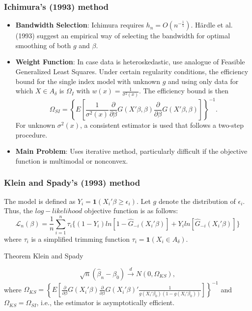 \documentclass{beamer}
\begin{document}
\begin{frame}
\frametitle{Ichimura's (1993) method}
\begin{itemize}
		\item \textbf{Bandwidth Selection}:
Ichimura requires $h_n=O(n^{-\frac{1}{5}})$. H{\"a}rdle et al. (1993) suggest an empirical way of selecting the bandwidth for optimal smoothing of both $g$ and $\beta$.
		\item \textbf{Weight Function}:
	In case data is heteroskedastic, use analogue of Feasible Generalized Least Squares. Under certain regularity conditions, the efficiency bound for the single index model with unknown $g$ and using only data for which $X \in A_{\delta}$ is $\Omega_I$ with $w(x) = \frac{1}{\sigma^2(x)}$. The efficiency bound is then
		\begin{equation}
\Omega_{SI} = \left\{ E\left[\frac{1}{\sigma^2(x)}\frac{\partial}{\partial \beta}
 G(X'\beta,\beta)\frac{\partial}{\partial \beta} G(X'\beta,\beta) \right] \right\}^{-1}.
		\end{equation}
For unknown $\sigma^2(x)$, a consistent estimator is used that follows a two-step procedure.
		\item \textbf{Main Problem}: Uses iterative method, particularly difficult if the objective function is multimodal or nonconvex.
\end{itemize}
\end{frame}






\begin{frame}
\frametitle{Klein and Spady's (1993) method}

The model is defined as $Y_i =  \mathbf{1}{(X_i'\beta \geq \epsilon_i)}$. Let $g$ denote the distribution of $\epsilon_i$.
Thus, the $log-likelihood$ objective function is as follows:
\begin{equation}
\mathcal{L}_n(\beta) = \frac{1}{n}\sum_{i=1}^n \tau_{i}\{ (1 - Y_i)ln[ 1 - \hat{G}_{-i}(X_i'\beta)] +  Y_iln[\hat{G}_{-i}(X_i'\beta)]\}
\end{equation}
where $\tau_i$ is a simplified trimming function $\tau_i = \mathbf{1}{(X_i \in A_\delta)}$.
\begin{block}{Theorem Klein and Spady}
{\footnotesize \[\sqrt{n}(\hat{\beta}_{n} - \beta_0) \stackrel{d}{\rightarrow} N(0,\Omega_{KS}),
\] where $ \Omega_{KS} = \left\{ E\left[\frac{\partial}{\partial \beta}
 G(X_i'\beta)\frac{\partial}{\partial \beta} G(X_i'\beta)'\frac{1}{g(X_i'\beta_0)(1 - g(X_i'\beta_0))} \right]\right\}^{-1} $
 and $\Omega_{KS} = \Omega_{SI}$, i.e., the estimator is asymptotically efficient.\par}
\end{block}

\end{frame}
\end{document}
